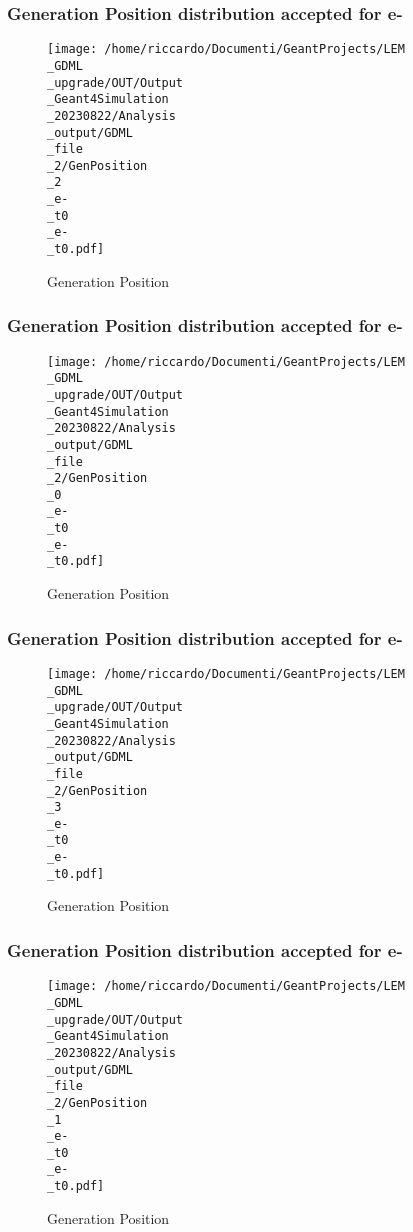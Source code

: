 \documentclass[8pt]{beamer}
\begin{document}
            \begin{frame}
                \frametitle{Generation Position distribution accepted for e-}
            
        \begin{figure}[h]
            \centering
            \texttt{[image: /home/riccardo/Documenti/GeantProjects/LEM\\\_GDML\\\_upgrade/OUT/Output\\\_Geant4Simulation\\\_20230822/Analysis\\\_output/GDML\\\_file\\\_2/GenPosition\\\_2\\\_e-\\\_t0\\\_e-\\\_t0.pdf]}
            \caption{Generation Position}
        \end{figure}
        
            \end{frame}
            
            \begin{frame}
                \frametitle{Generation Position distribution accepted for e-}
            
        \begin{figure}[h]
            \centering
            \texttt{[image: /home/riccardo/Documenti/GeantProjects/LEM\\\_GDML\\\_upgrade/OUT/Output\\\_Geant4Simulation\\\_20230822/Analysis\\\_output/GDML\\\_file\\\_2/GenPosition\\\_0\\\_e-\\\_t0\\\_e-\\\_t0.pdf]}
            \caption{Generation Position}
        \end{figure}
        
            \end{frame}
            
            \begin{frame}
                \frametitle{Generation Position distribution accepted for e-}
            
        \begin{figure}[h]
            \centering
            \texttt{[image: /home/riccardo/Documenti/GeantProjects/LEM\\\_GDML\\\_upgrade/OUT/Output\\\_Geant4Simulation\\\_20230822/Analysis\\\_output/GDML\\\_file\\\_2/GenPosition\\\_3\\\_e-\\\_t0\\\_e-\\\_t0.pdf]}
            \caption{Generation Position}
        \end{figure}
        
            \end{frame}
            
            \begin{frame}
                \frametitle{Generation Position distribution accepted for e-}
            
        \begin{figure}[h]
            \centering
            \texttt{[image: /home/riccardo/Documenti/GeantProjects/LEM\\\_GDML\\\_upgrade/OUT/Output\\\_Geant4Simulation\\\_20230822/Analysis\\\_output/GDML\\\_file\\\_2/GenPosition\\\_1\\\_e-\\\_t0\\\_e-\\\_t0.pdf]}
            \caption{Generation Position}
        \end{figure}
        
            \end{frame}
            
\end{document}

